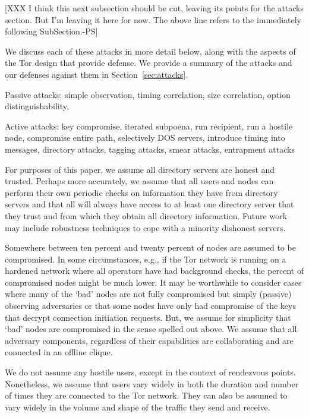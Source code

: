 \documentclass[times,10pt,twocolumn]{article}
\begin{document}
[XXX I think this next subsection should be cut, leaving its points
for the attacks section. But I'm leaving it here for now. The above
line refers to the immediately following SubSection.-PS]


\label{subsec:known-attacks}

We discuss each of these attacks in more detail below, along with the
aspects of the Tor design that provide defense. We provide a summary
of the attacks and our defenses against them in Section~\ref{sec:attacks}.

Passive attacks:
simple observation,
timing correlation,
size correlation,
option distinguishability,

Active attacks:
key compromise,
iterated subpoena,
run recipient,
run a hostile node,
compromise entire path,
selectively DOS servers,
introduce timing into messages,
directory attacks,
tagging attacks,
smear attacks,
entrapment attacks



For purposes of this paper, we assume all directory servers are honest
and trusted. Perhaps more accurately, we assume that all users and
nodes can perform their own periodic checks on information they have
from directory servers and that all will always have access to at
least one directory server that they trust and from which they obtain
all directory information. Future work may include robustness
techniques to cope with a minority dishonest servers.

Somewhere between ten percent and twenty percent of nodes are assumed
to be compromised. In some circumstances, e.g., if the Tor network is
running on a hardened network where all operators have had
background checks, the percent of compromised nodes might be much
lower. It may be worthwhile to consider cases where many of the `bad'
nodes are not fully compromised but simply (passive) observing
adversaries or that some nodes have only had compromise of the keys
that decrypt connection initiation requests. But, we assume for
simplicity that `bad' nodes are compromised in the sense spelled out
above. We assume that all adversary components, regardless of their
capabilities are collaborating and are connected in an offline clique.

We do not assume any hostile users, except in the context of
rendezvous points. Nonetheless, we assume that users vary widely in
both the duration and number of times they are connected to the Tor
network. They can also be assumed to vary widely in the volume and
shape of the traffic they send and receive.
\end{document}
